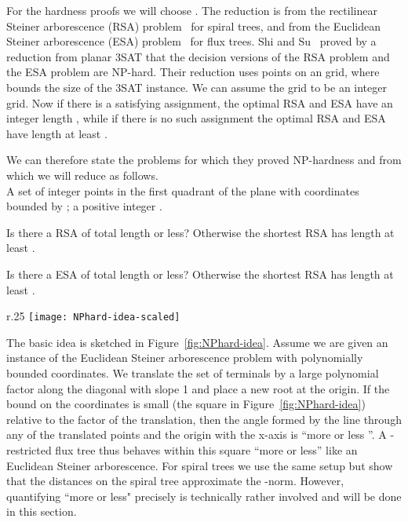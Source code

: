 \documentclass{journalA4}
\begin{document}
For the hardness proofs we will choose . The reduction is from the rectilinear Steiner arborescence (RSA) problem~\cite{ss-rsap-05} for spiral trees, and
from the Euclidean Steiner arborescence (ESA) problem~\cite{Shi2000} for flux trees.
Shi and Su~\cite{ss-rsap-05} proved by a reduction from planar 3SAT that the decision versions of the RSA problem and the ESA problem are NP-hard. Their reduction uses points on an  grid, where  bounds the size of the 3SAT instance. We can assume the grid to be an integer grid. Now if there is a satisfying assignment, the optimal RSA and ESA have an integer length , while if there is no such assignment the optimal RSA and ESA have length at least .

We can therefore state the problems for which they proved NP-hardness and from which we will reduce as follows.
\\
 A set of integer points  in the first quadrant of the plane with coordinates bounded by ; a positive integer .

 Is there a RSA of total length  or less? Otherwise the shortest RSA has length at least .

 Is there a ESA of total length  or less? Otherwise the shortest RSA has length at least .

\begin{wrapfigure}[10]{r}{.25\textwidth}
  \centering
  \vspace{.35\baselineskip}
  \texttt{[image: NPhard-idea-scaled]}
  \vspace{-.35\baselineskip}
  \small{\caption{Reduction.\label{fig:NPhard-idea}}}
\end{wrapfigure}
The basic idea is sketched in Figure~\ref{fig:NPhard-idea}. Assume we are given an instance of the Euclidean Steiner arborescence problem with polynomially bounded coordinates. We translate the set of terminals by a large polynomial factor along the diagonal with slope 1 and place a new root at the origin. If the bound on the coordinates is small (the square in Figure~\ref{fig:NPhard-idea}) relative to the factor of the translation, then the angle formed by the line through any of the translated points and the origin with the x-axis is ``more or less ''. A -restricted flux tree thus behaves within this square ``more or less'' like an Euclidean Steiner arborescence. For spiral trees we use the same setup but show that the distances on the spiral tree approximate the -norm. However, quantifying ``more or less" precisely is technically rather involved and will be done in this section.
\end{document}
